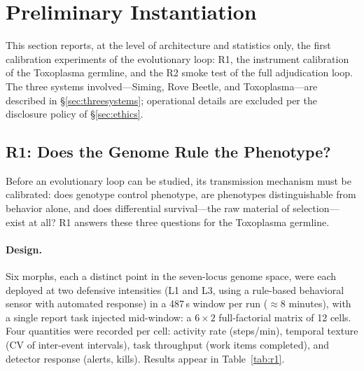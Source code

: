 \documentclass[11pt,a4paper]{article}
\begin{document}
\section{Preliminary Instantiation}
\label{sec:instantiation}

This section reports, at the level of architecture and statistics only, the first calibration experiments of the evolutionary loop: R1, the instrument calibration of the Toxoplasma germline, and the R2 smoke test of the full adjudication loop. The three systems involved---Siming, Rove Beetle, and Toxoplasma---are described in \S\ref{sec:threesystems}; operational details are excluded per the disclosure policy of \S\ref{sec:ethics}.

\subsection{R1: Does the Genome Rule the Phenotype?}
\label{sec:r1}

Before an evolutionary loop can be studied, its transmission mechanism must be calibrated: does genotype control phenotype, are phenotypes distinguishable from behavior alone, and does differential survival---the raw material of selection---exist at all? R1 answers these three questions for the Toxoplasma germline.

\paragraph{Design.} Six morphs, each a distinct point in the seven-locus genome space, were each deployed at two defensive intensities (L1 and L3, using a rule-based behavioral sensor with automated response) in a 487\,s window per run ($\approx$8 minutes), with a single report task injected mid-window: a $6 \times 2$ full-factorial matrix of 12 cells. Four quantities were recorded per cell: activity rate (steps/min), temporal texture (CV of inter-event intervals), task throughput (work items completed), and detector response (alerts, kills). Results appear in Table~\ref{tab:r1}.
\end{document}
